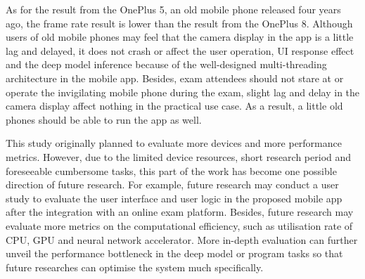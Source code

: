 As for the result from the OnePlus 5, an old mobile phone released four years ago, the frame rate result is lower than the result from the OnePlus 8.
Although users of old mobile phones may feel that the camera display in the app is a little lag and delayed, it does not crash or affect the user operation, UI response effect and the deep model inference because of the well-designed multi-threading architecture in the mobile app.
Besides, exam attendees should not stare at or operate the invigilating mobile phone during the exam, slight lag and delay in the camera display affect nothing in the practical use case.
As a result, a little old phones should be able to run the app as well.

This study originally planned to evaluate more devices and more performance metrics.
However, due to the limited device resources, short research period and foreseeable cumbersome tasks, this part of the work has become one possible direction of future research.
For example, future research may conduct a user study to evaluate the user interface and user logic in the proposed mobile app after the integration with an online exam platform.
Besides, future research may evaluate more metrics on the computational efficiency, such as utilisation rate of CPU, GPU and neural network accelerator.
More in-depth evaluation can further unveil the performance bottleneck in the deep model or program tasks so that future researches can optimise the system much specifically.